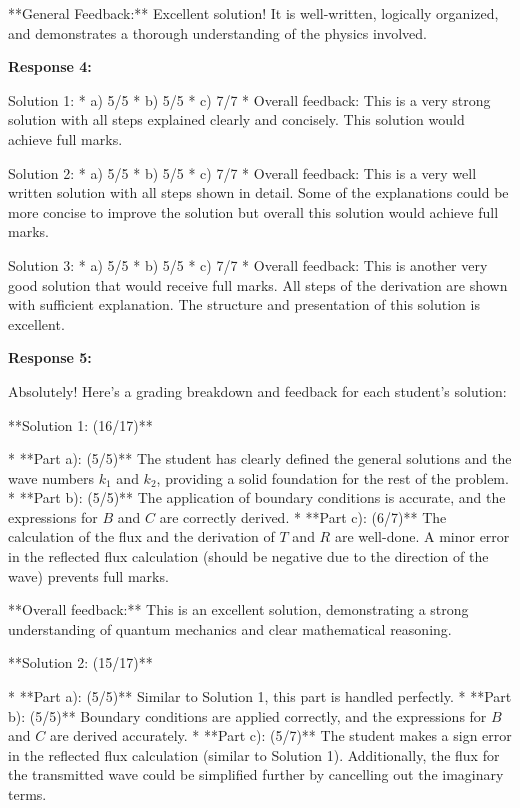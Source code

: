 \documentclass[a4paper,11pt]{article}
\begin{document}
**General Feedback:**  Excellent solution! It is well-written, logically organized, and demonstrates a thorough understanding of the physics involved. 

\bigskip    
\textbf{Response 4:}

Solution 1:
* a) 5/5
* b) 5/5
* c) 7/7
* Overall feedback: This is a very strong solution with all steps explained clearly and concisely. This solution would achieve full marks.

Solution 2:
* a) 5/5
* b) 5/5
* c) 7/7
* Overall feedback: This is a very well written solution with all steps shown in detail. Some of the explanations could be more concise to improve the solution but overall this solution would achieve full marks.

Solution 3:
* a) 5/5
* b) 5/5
* c) 7/7
* Overall feedback: This is another very good solution that would receive full marks. All steps of the derivation are shown with sufficient explanation. The structure and presentation of this solution is excellent.

\bigskip    
\textbf{Response 5:}

Absolutely! Here's a grading breakdown and feedback for each student's solution:

**Solution 1: (16/17)**

*   **Part a): (5/5)**  The student has clearly defined the general solutions and the wave numbers  \( k_1 \) and \( k_2 \), providing a solid foundation for the rest of the problem.
*   **Part b): (5/5)** The application of boundary conditions is accurate, and the expressions for \( B \) and \( C \) are correctly derived. 
*   **Part c): (6/7)** The calculation of the flux and the derivation of \( T \) and \( R \) are well-done. A minor error in the reflected flux calculation (should be negative due to the direction of the wave) prevents full marks.

**Overall feedback:** This is an excellent solution, demonstrating a strong understanding of quantum mechanics and clear mathematical reasoning. 

**Solution 2: (15/17)**

*   **Part a): (5/5)** Similar to Solution 1, this part is handled perfectly.
*   **Part b): (5/5)** Boundary conditions are applied correctly, and the expressions for \( B \) and \( C \) are derived accurately.
*   **Part c): (5/7)** The student makes a sign error in the reflected flux calculation (similar to Solution 1). Additionally, the flux for the transmitted wave could be simplified further by cancelling out the imaginary terms.
\end{document}
